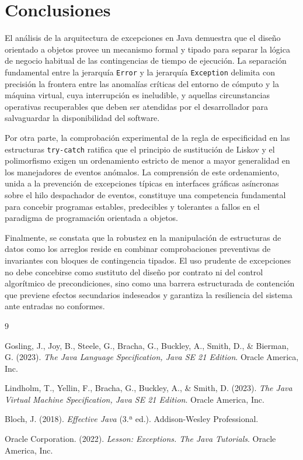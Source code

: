 \documentclass[letterpaper,12pt,oneside]{article}
\numberwithin{figure}{section}
\begin{document}
\clearpage
\section{Conclusiones}

El análisis de la arquitectura de excepciones en Java demuestra que el diseño orientado a objetos provee un mecanismo formal y tipado para separar la lógica de negocio habitual de las contingencias de tiempo de ejecución. La separación fundamental entre la jerarquía \texttt{Error} y la jerarquía \texttt{Exception} delimita con precisión la frontera entre las anomalías críticas del entorno de cómputo y la máquina virtual, cuya interrupción es ineludible, y aquellas circunstancias operativas recuperables que deben ser atendidas por el desarrollador para salvaguardar la disponibilidad del software.

Por otra parte, la comprobación experimental de la regla de especificidad en las estructuras \texttt{try-catch} ratifica que el principio de sustitución de Liskov y el polimorfismo exigen un ordenamiento estricto de menor a mayor generalidad en los manejadores de eventos anómalos. La comprensión de este ordenamiento, unida a la prevención de excepciones típicas en interfaces gráficas asíncronas sobre el hilo despachador de eventos, constituye una competencia fundamental para concebir programas estables, predecibles y tolerantes a fallos en el paradigma de programación orientada a objetos.

Finalmente, se constata que la robustez en la manipulación de estructuras de datos como los arreglos reside en combinar comprobaciones preventivas de invariantes con bloques de contingencia tipados. El uso prudente de excepciones no debe concebirse como sustituto del diseño por contrato ni del control algorítmico de precondiciones, sino como una barrera estructurada de contención que previene efectos secundarios indeseados y garantiza la resiliencia del sistema ante entradas no conformes.

\begin{thebibliography}{9}

Gosling, J., Joy, B., Steele, G., Bracha, G., Buckley, A., Smith, D., \& Bierman, G. (2023).
\textit{The Java Language Specification, Java SE 21 Edition}.
Oracle America, Inc.

Lindholm, T., Yellin, F., Bracha, G., Buckley, A., \& Smith, D. (2023).
\textit{The Java Virtual Machine Specification, Java SE 21 Edition}.
Oracle America, Inc.

Bloch, J. (2018).
\textit{Effective Java} (3.ª ed.).
Addison-Wesley Professional.

Oracle Corporation. (2022).
\textit{Lesson: Exceptions. The Java Tutorials}.
Oracle America, Inc.

\end{thebibliography}
\end{document}
